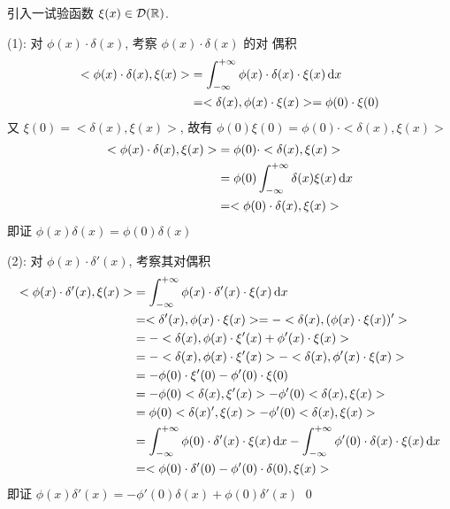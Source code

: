 \solution
引入一试验函数 $\xi(x) \in \mathcal D({\mathbb R})$.

\noindent (1): 对 $\phi(x) \cdot \delta(x)$, 考察 $\phi(x) \cdot \delta(x)$ 的对
偶积
\[ \begin{aligned}
<\phi(x) \cdot \delta(x), \xi(x)> &= \int_{-\infty}^{+\infty} 
	\phi(x) \cdot \delta(x) \cdot \xi(x) \operatorname{d\!} x \\
&= <\delta(x), \phi(x) \cdot \xi(x)> = \phi(0) \cdot \xi(0)
\end{aligned} \]
又 $\xi(0) = <\delta(x), \xi(x)>$, 故有
$\phi(0)\xi(0) = \phi(0) \cdot <\delta(x), \xi(x)>$
\[ \begin{aligned}
<\phi(x) \cdot \delta(x), \xi(x)> &= \phi(0) \cdot <\delta(x), \xi(x)> \\
&= \phi(0) \int_{-\infty}^{+\infty}\delta(x)\xi(x)\operatorname{d\!} x \\
&= <\phi(0) \cdot \delta(x), \xi(x)>
\end{aligned} \]
即证 $\phi(x)\delta(x) = \phi(0)\delta(x)$

\noindent (2): 对 $\phi(x) \cdot \delta'(x)$, 考察其对偶积
\[ \begin{aligned}
<\phi(x) \cdot \delta'(x), \xi(x)> &= \int_{-\infty}^{+\infty} 
	\phi(x) \cdot \delta'(x) \cdot \xi(x) \operatorname{d\!} x \\
&= <\delta'(x), \phi(x)\cdot\xi(x)> = -<\delta(x), (\phi(x)\cdot\xi(x))'> \\
&= -<\delta(x), \phi(x)\cdot\xi'(x) + \phi'(x)\cdot\xi(x)> \\
&= -<\delta(x), \phi(x)\cdot\xi'(x)> - <\delta(x), \phi'(x)\cdot\xi(x)> \\
&= -\phi(0)\cdot\xi'(0) - \phi'(0)\cdot\xi(0) \\
&= -\phi(0)<\delta(x), \xi'(x)> - \phi'(0)<\delta(x), \xi(x)> \\
&= \phi(0)<\delta(x)', \xi(x)> - \phi'(0)<\delta(x), \xi(x)> \\
&= \int_{-\infty}^{+\infty} \phi(0)\cdot\delta'(x)\cdot\xi(x) \operatorname{d\!} x
- \int_{-\infty}^{+\infty} \phi'(0)\cdot\delta(x)\cdot\xi(x) \operatorname{d\!} x \\
&= <\phi(0)\cdot\delta'(0) - \phi'(0)\cdot\delta(0), \xi(x)>
\end{aligned} \]
即证 $\phi(x)\delta'(x) = -\phi'(0)\delta(x) + \phi(0)\delta'(x)$
\qed


